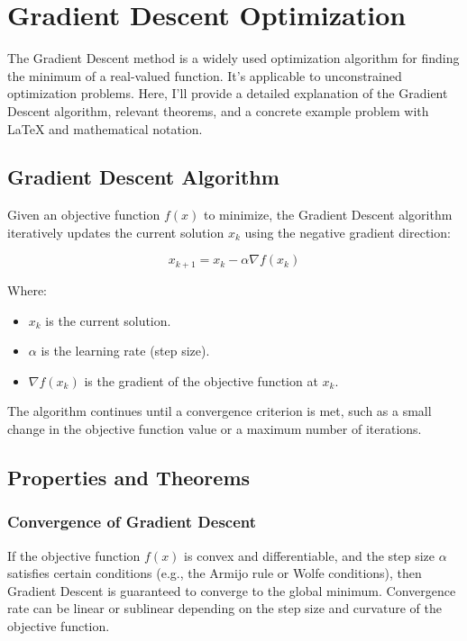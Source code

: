 \documentclass[a4paper]{article}
\begin{document}
\section{Gradient Descent Optimization}

The Gradient Descent method is a widely used optimization algorithm for finding the minimum of a real-valued function. It's applicable to unconstrained optimization problems. Here, I'll provide a detailed explanation of the Gradient Descent algorithm, relevant theorems, and a concrete example problem with LaTeX and mathematical notation.

\subsection{Gradient Descent Algorithm}

Given an objective function $f(x)$ to minimize, the Gradient Descent algorithm iteratively updates the current solution $x_k$ using the negative gradient direction:

\[
x_{k+1} = x_k - \alpha \nabla f(x_k)
\]

Where:
\begin{itemize}
  \item $x_k$ is the current solution.
  \item $\alpha$ is the learning rate (step size).
  \item $\nabla f(x_k)$ is the gradient of the objective function at $x_k$.
\end{itemize}

The algorithm continues until a convergence criterion is met, such as a small change in the objective function value or a maximum number of iterations.

\subsection{Properties and Theorems}

\subsubsection{Convergence of Gradient Descent}

If the objective function $f(x)$ is convex and differentiable, and the step size $\alpha$ satisfies certain conditions (e.g., the Armijo rule or Wolfe conditions), then Gradient Descent is guaranteed to converge to the global minimum. Convergence rate can be linear or sublinear depending on the step size and curvature of the objective function.
\end{document}
